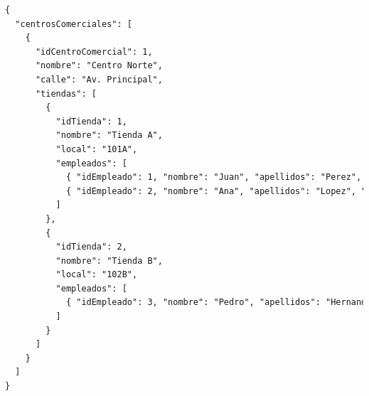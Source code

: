 \documentclass[
    12pt,
    a4paper,
    addpoints,
    answers,
    convocatoria=ord,
    titulacion=NoCD,
    curso=2024/2025,
]{db-exam}
\begin{document}
\begin{questions}
\begin{solution}
\begin{lstlisting}[language=HTML]
{
  "centrosComerciales": [
    {
      "idCentroComercial": 1,
      "nombre": "Centro Norte",
      "calle": "Av. Principal",
      "tiendas": [
        {
          "idTienda": 1,
          "nombre": "Tienda A",
          "local": "101A",
          "empleados": [            
            { "idEmpleado": 1, "nombre": "Juan", "apellidos": "Perez", "edad": 30, "sueldo": 1600 },
            { "idEmpleado": 2, "nombre": "Ana", "apellidos": "Lopez", "edad": 25, "sueldo": 1400 }
          ]
        },
        {
          "idTienda": 2,
          "nombre": "Tienda B",
          "local": "102B",
          "empleados": [
            { "idEmpleado": 3, "nombre": "Pedro", "apellidos": "Hernandez", "edad": 40, "sueldo": 1700 }
          ]
        }
      ]
    }
  ]
}
\end{lstlisting}       
\end{solution}


\end{questions}
\end{document}
